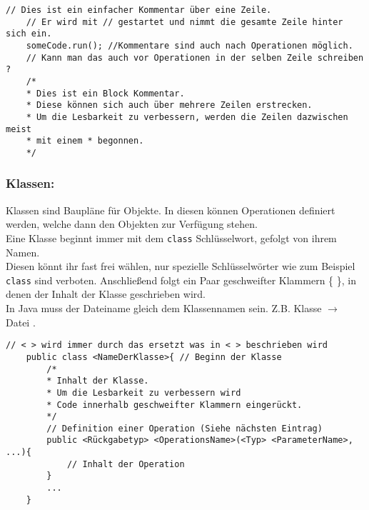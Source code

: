 \begin{lstlisting}[title=\textbf{Kommentar Beispiel}]
	// Dies ist ein einfacher Kommentar über eine Zeile.
	// Er wird mit // gestartet und nimmt die gesamte Zeile hinter sich ein.
	someCode.run(); //Kommentare sind auch nach Operationen möglich.
	// Kann man das auch vor Operationen in der selben Zeile schreiben ?
	/*
	* Dies ist ein Block Kommentar.
	* Diese können sich auch über mehrere Zeilen erstrecken.
	* Um die Lesbarkeit zu verbessern, werden die Zeilen dazwischen meist
	* mit einem * begonnen.
	*/
\end{lstlisting}
\lstset{
	basicstyle=\small
}
\begin{Infobox}

	\subsubsection*{Klassen:}
	Klassen sind Baupläne für Objekte.
	In diesen können Operationen definiert werden, welche dann den Objekten zur Verfügung stehen.\\
	Eine Klasse beginnt immer mit dem \lstinline{class} Schlüsselwort, gefolgt von ihrem Namen.\\
	Diesen könnt ihr fast frei wählen, nur spezielle Schlüsselwörter wie zum Beispiel \lstinline{class} sind verboten.
	Anschließend folgt ein Paar geschweifter Klammern \{ \}, in denen der Inhalt der Klasse geschrieben wird.\\
	In Java muss der Dateiname gleich dem Klassennamen sein. Z.B. Klasse  $\rightarrow$ Datei .
\end{Infobox}

\newpage

\begin{lstlisting}[title=\textbf{Klassen Syntax}]
	// < > wird immer durch das ersetzt was in < > beschrieben wird
	public class <NameDerKlasse>{ // Beginn der Klasse
		/*
		* Inhalt der Klasse.
		* Um die Lesbarkeit zu verbessern wird
		* Code innerhalb geschweifter Klammern eingerückt.
		*/
		// Definition einer Operation (Siehe nächsten Eintrag)
		public <Rückgabetyp> <OperationsName>(<Typ> <ParameterName>, ...){
			// Inhalt der Operation
		}
		...
	}
\end{lstlisting}

